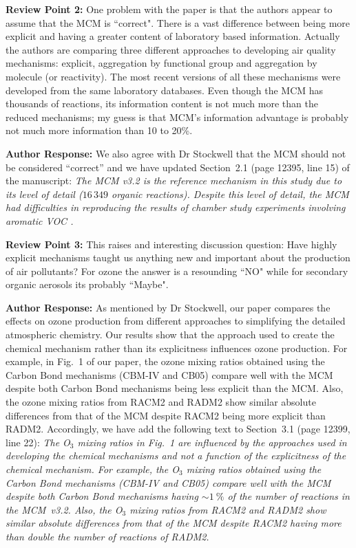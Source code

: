 \documentclass{article}
\begin{document}
\textbf{Review Point 2: } One problem with the paper is that the authors appear to assume that the MCM is ``correct". There is a vast difference between being more explicit and having a greater content of laboratory based information. Actually the authors are comparing three different approaches to developing air quality mechanisms: explicit, aggregation by functional group and aggregation by molecule (or reactivity). The most recent versions of all these mechanisms were developed from the same laboratory databases. Even though the MCM has thousands of reactions, its information content is not much more than the reduced mechanisms; my guess is that MCM’s information advantage is probably not much more information than 10 to 20\%.

\textbf{Author Response:}
We also agree with Dr Stockwell that the MCM should not be considered ``correct'' and we have updated Section~2.1 (page 12395, line 15) of the manuscript: \textit{The MCM v3.2 is the reference mechanism in this study due to its level of detail ($16\,349$ organic reactions). Despite this level of detail, the MCM had difficulties in reproducing the results of chamber study experiments involving aromatic VOC \citep{Bloss:2005}.}

\textbf{Review Point 3: } This raises and interesting discussion question: Have highly explicit mechanisms taught us anything new and important about the production of air pollutants? For ozone the answer is a resounding ``NO" while for secondary organic aerosols its probably ``Maybe".

\textbf{Author Response:}
As mentioned by Dr Stockwell, our paper compares the effects on ozone production from different approaches to simplifying the detailed atmospheric chemistry.
Our results show that the approach used to create the chemical mechanism rather than its explicitness influences ozone production.
For example, in Fig.~1 of our paper, the ozone mixing ratios obtained using the Carbon Bond mechanisms (CBM-IV and CB05) compare well with the MCM despite both Carbon Bond mechanisms being less explicit than the MCM.
Also, the ozone mixing ratios from RACM2 and RADM2 show similar absolute differences from that of the MCM despite RACM2 being more explicit than RADM2.
Accordingly, we have add the following text to Section~3.1 (page 12399, line 22):
\textit{The O$_3$ mixing ratios in Fig.~1 are influenced by the approaches used in developing the chemical mechanisms and not a function of the explicitness of the chemical mechanism.  For example, the O$_3$ mixing ratios obtained using the Carbon Bond mechanisms (CBM-IV and CB05) compare well with the MCM despite both Carbon Bond mechanisms having $\sim1~\%$ of the number of reactions in the MCM~v3.2.  Also, the O$_3$ mixing ratios from RACM2 and RADM2 show similar absolute differences from that of the MCM despite RACM2 having more than double the number of reactions of RADM2.}
\end{document}
